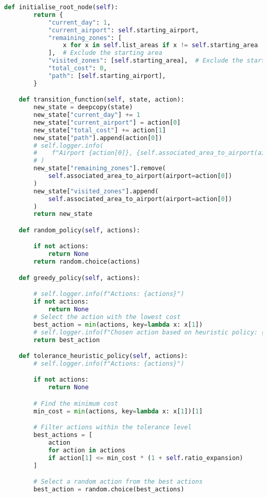 \begin{lstlisting}[language = Python]
    def initialise_root_node(self):
        return {
            "current_day": 1,
            "current_airport": self.starting_airport,
            "remaining_zones": [
                x for x in self.list_areas if x != self.starting_area
            ],  # Exclude the starting area
            "visited_zones": [self.starting_area],  # Exclude the starting area
            "total_cost": 0,
            "path": [self.starting_airport],
        }

    def transition_function(self, state, action):
        new_state = deepcopy(state)
        new_state["current_day"] += 1
        new_state["current_airport"] = action[0]
        new_state["total_cost"] += action[1]
        new_state["path"].append(action[0])
        # self.logger.info(
        #    f"Airport {action[0]}, {self.associated_area_to_airport(airport=action[0])} to remove in {new_state['remaining_zones']}"
        # )
        new_state["remaining_zones"].remove(
            self.associated_area_to_airport(airport=action[0])
        )
        new_state["visited_zones"].append(
            self.associated_area_to_airport(airport=action[0])
        )
        return new_state

    def random_policy(self, actions):

        if not actions:
            return None
        return random.choice(actions)

    def greedy_policy(self, actions):

        # self.logger.info(f"Actions: {actions}")
        if not actions:
            return None
        # Select the action with the lowest cost
        best_action = min(actions, key=lambda x: x[1])
        # self.logger.info(f"Chosen action based on heuristic policy: {best_action}")
        return best_action

    def tolerance_heuristic_policy(self, actions):
        # self.logger.info(f"Actions: {actions}")

        if not actions:
            return None

        # Find the minimum cost
        min_cost = min(actions, key=lambda x: x[1])[1]

        # Filter actions within the tolerance level
        best_actions = [
            action
            for action in actions
            if action[1] <= min_cost * (1 + self.ratio_expansion)
        ]

        # Select a random action from the best actions
        best_action = random.choice(best_actions)


\end{lstlisting}
